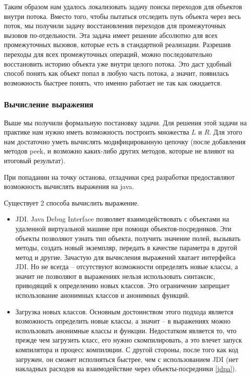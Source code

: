Таким образом нам удалось локализовать задачу поиска переходов для объектов внутри потока. Вместо того, чтобы пытаться отследить путь объекта через весь поток, мы получили задачу восстановления переходов для промежуточных вызовов по-отдельности. Эта задача имеет решение абсолютно для всех промежуточных вызовов, которые есть в стандартной реализации. Разрешив переходы для всех промежуточных операций, можно последовательно восстановить историю объекта уже внутри целого потока. Это даст удобный способ понять как объект попал в любую часть потока, а значит, появилась возможность быстрее понять, что именно работает не так как ожидается.
\subsubsection{Вычисление выражения}
Выше мы получили формальную постановку задачи. Для решения этой задачи на практике нам нужно иметь возможность построить множества $L$ и $R$. Для этого нам достаточно уметь вычислять модифицированную цепочку (после добавления методов peek, и возможно каких-либо других методов, которые не влияют на итоговый результат).

При попадании на точку останова, отладчики сред разработки предоставляют возможность вычислять выражения на java.

Существует 2 способа вычислить выражение. 
\begin{itemize}
	\item JDI. Java Debug Interface позволяет взаимодействовать с объектами на удаленной виртуальной машине при помощи объектов-посредников. Эти объекты позволяют узнать тип объекта, получить значение полей, вызывать методы, создать новый экземпляр, передать в качестве параметра в другой метод и другие. Зачастую для вычисления выражений хватает интерфейса JDI. Но не всегда -- отсутствуют возможности определять новые классы, а значит не позволяют в выражениях нельзя использовать синтаксис, приводящий к определению новых классов. Это ограничение запрещает использование анонимных классов и анонимных функций.
	\item Загрузка новых классов. Основным достоинством этого подхода является возможность определить новые классы, а значит -- в выражениях можно использовать анонимные классы и функции. Недостатком является то, что прежде чем загрузить класс, его нужно скомпилировать, а это влечет запуск компилятора и процесс компиляции. С другой стороны, после того как код загружен, он сможет исполняться быстрее, чем с использованием JDI (нет накладных расходов на взаимодействие через объекты-посредники \ref{jdpa}).
\end{itemize}

